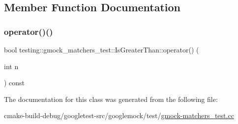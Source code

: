 \subsection{Member Function Documentation}
\mbox{\label{classtesting_1_1gmock__matchers__test_1_1IsGreaterThan_a34b455148a2d299c654bc4443db0af67}} 
\subsubsection{\texorpdfstring{operator()()}{operator()()}}
{\footnotesize\ttfamily bool testing\+::gmock\+\_\+matchers\+\_\+test\+::\+Is\+Greater\+Than\+::operator() (\begin{DoxyParamCaption}\item[{int}]{n }\end{DoxyParamCaption}) const\hspace{0.3cm}{\ttfamily [inline]}}



The documentation for this class was generated from the following file\+:\begin{DoxyCompactItemize}
\item 
cmake-\/build-\/debug/googletest-\/src/googlemock/test/\mbox{\hyperlink{gmock-matchers__test_8cc}{gmock-\/matchers\+\_\+test.\+cc}}\end{DoxyCompactItemize}
